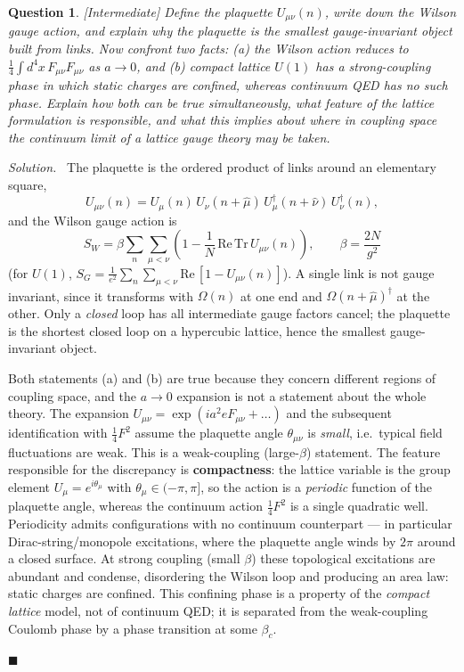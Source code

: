 \documentclass[11pt]{article}
\newcommand{\diff}[1]{\textcolor{blue!60!black}{\footnotesize\textsf{[#1]}}\quad}
\newtheorem{question}{Question}
\newenvironment{solution}{\par\smallskip\noindent\textit{Solution.}\ }{\hfill$\blacksquare$\par\smallskip}
\begin{document}
\begin{question}
\diff{Intermediate} Define the plaquette $U_{\mu\nu}(n)$, write down the Wilson gauge action, and explain why the plaquette is the smallest gauge-invariant object built from links. Now confront two facts: (a) the Wilson action reduces to $\tfrac14\int d^4x\, F_{\mu\nu}F_{\mu\nu}$ as $a\to 0$, and (b) \emph{compact} lattice $U(1)$ has a strong-coupling phase in which static charges are confined, whereas continuum QED has no such phase. Explain how both can be true simultaneously, what feature of the lattice formulation is responsible, and what this implies about \emph{where} in coupling space the continuum limit of a lattice gauge theory may be taken.
\end{question}
\begin{solution}
The plaquette is the ordered product of links around an elementary square,
\begin{equation}
U_{\mu\nu}(n) = U_\mu(n)\, U_\nu(n+\hat\mu)\, U_\mu^\dagger(n+\hat\nu)\, U_\nu^\dagger(n),
\end{equation}
and the Wilson gauge action is
\begin{equation}
S_W = \beta \sum_n \sum_{\mu<\nu}\left(1 - \frac{1}{N}\,\mathrm{Re}\,\mathrm{Tr}\, U_{\mu\nu}(n)\right), \qquad \beta = \frac{2N}{g^2}
\end{equation}
(for $U(1)$, $S_G = \frac{1}{e^2}\sum_n\sum_{\mu<\nu}\mathrm{Re}\,[1 - U_{\mu\nu}(n)]$). A single link is not gauge invariant, since it transforms with $\Omega(n)$ at one end and $\Omega(n+\hat\mu)^\dagger$ at the other. Only a \emph{closed} loop has all intermediate gauge factors cancel; the plaquette is the shortest closed loop on a hypercubic lattice, hence the smallest gauge-invariant object.

Both statements (a) and (b) are true because they concern different regions of coupling space, and the $a\to0$ expansion is not a statement about the whole theory. The expansion $U_{\mu\nu} = \exp(ia^2 e F_{\mu\nu} + \dots)$ and the subsequent identification with $\tfrac14 F^2$ assume the plaquette angle $\theta_{\mu\nu}$ is \emph{small}, i.e.\ typical field fluctuations are weak. This is a weak-coupling (large-$\beta$) statement. The feature responsible for the discrepancy is \textbf{compactness}: the lattice variable is the group element $U_\mu = e^{i\theta_\mu}$ with $\theta_\mu \in (-\pi,\pi]$, so the action is a \emph{periodic} function of the plaquette angle, whereas the continuum action $\tfrac14 F^2$ is a single quadratic well. Periodicity admits configurations with no continuum counterpart --- in particular Dirac-string/monopole excitations, where the plaquette angle winds by $2\pi$ around a closed surface. At strong coupling (small $\beta$) these topological excitations are abundant and condense, disordering the Wilson loop and producing an area law: static charges are confined. This confining phase is a property of the \emph{compact lattice} model, not of continuum QED; it is separated from the weak-coupling Coulomb phase by a phase transition at some $\beta_c$.


\end{solution}
\end{document}
